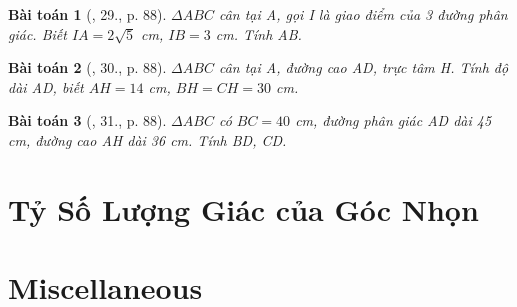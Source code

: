 \documentclass{article}
\newtheorem{baitoan}{Bài toán}
\begin{document}
\begin{baitoan}[\cite{Binh_Toan_9_tap_1}, 29., p. 88]
	$\Delta ABC$ cân tại A, gọi I là giao điểm của 3 đường phân giác. Biết $IA = 2\sqrt{5}$ {\rm cm}, $IB = 3$ {\rm cm}. Tính AB.
\end{baitoan}

\begin{baitoan}[\cite{Binh_Toan_9_tap_1}, 30., p. 88]
	$\Delta ABC$ cân tại A, đường cao AD, trực tâm H. Tính độ dài AD, biết $AH = 14$ {\rm cm}, $BH = CH = 30$ {\rm cm}.
\end{baitoan}

\begin{baitoan}[\cite{Binh_Toan_9_tap_1}, 31., p. 88]
	$\Delta ABC$ có $BC = 40$ {\rm cm}, đường phân giác AD dài {\rm45 cm}, đường cao AH dài {\rm36 cm}. Tính BD, CD.
\end{baitoan}


\section{Tỷ Số Lượng Giác của Góc Nhọn}


\section{Miscellaneous}


\printbibliography[heading=bibintoc]
\end{document}
